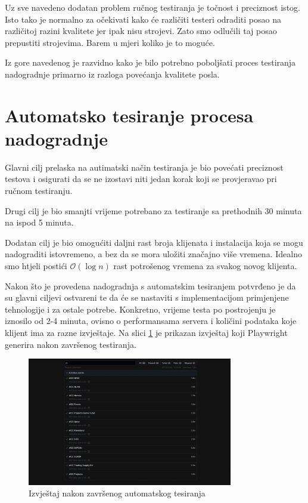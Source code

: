 Uz sve navedeno dodatan problem ručnog testiranja je točnost i preciznost istog.
Isto tako je normalno za očekivati kako će različiti testeri odraditi posao na različitoj razini kvalitete jer ipak nisu strojevi.
Zato smo odlučili taj posao prepustiti strojevima.
Barem u mjeri koliko je to moguće.

Iz gore navedenog je razvidno kako je bilo potrebno poboljšati proces testiranja nadogradnje primarno iz razloga povećanja kvalitete posla.

\section{Automatsko tesiranje procesa nadogradnje}

Glavni cilj prelaska na autimatski način testiranja je bio povećati preciznost testova i osigurati da se ne izostavi niti jedan korak koji se provjeravao pri ručnom testiranju.

Drugi cilj je bio smanjti vrijeme potrebano za testiranje sa prethodnih 30 minuta na ispod 5 minuta.

Dodatan cilj je bio omogućiti daljni rast broja klijenata i instalacija koja se mogu nadograditi istovremeno, a bez da se mora uložiti značajno više vremena.
Idealno smo htjeli postići $\mathcal{O}(\log n)$ rast potrošenog vremena za svakog novog klijenta.

Nakon što je provedena nadogradnja s automatskim tesiranjem potvrđeno je da su glavni ciljevi ostvareni te da će se nastaviti s implementacijom primjenjene tehnologije i za ostale potrebe.
Konkretno, vrijeme testa po postrojenju je iznosilo od 2-4 minuta, ovisno o performansama servera i količini podataka koje klijent ima za razne izvještaje.
Na slici \ref{img:fullTestPass} je prikazan izvještaj koji Playwright generira nakon završenog testiranja.
\begin{figure}[!h]\begin{center}
    \includegraphics[width=0.8\textwidth]{"img/fullTestPass"}
    \caption{Izvještaj nakon završenog automatskog tesiranja}\label{img:fullTestPass}
    \end{center}\end{figure}

